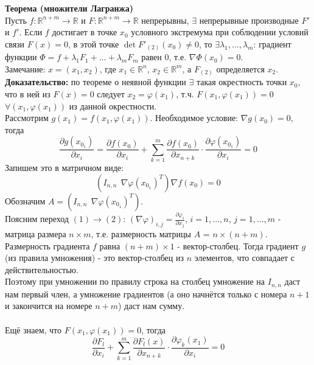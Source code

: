 \documentclass[book, 11pt]{report}
\begin{document}
\par{
\textbf{Теорема (множители Лагранжа)}\\
Пусть $f:\mathbb{R}^{n+m}\to\mathbb{R}$ и $F:\mathbb{R}^{n+m}\to\mathbb{R}$ непрерывны, $\exists$ непрерывные производные $F'$ и $f'$. Если $f$ достигает в точке $x_0$ условного экстремума при соблюдении условий связи $F(x)=0$, в этой точке $\det F'_{(2)}(x_0)\ne0$, то $\exists\lambda_1,\ldots,\lambda_m$: градиент функции $\Phi=f+\lambda_1F_1+\ldots+\lambda_mF_m$ равен 0, т.е. $\nabla\Phi(x_0)=0$.\\
Замечание: $x=(x_{1},x_{2})$, где $x_1\in\mathbb{R}^n$, $x_2\in\mathbb{R}^m$, а $F_{(2)}$ определяется $x_2$.\\
\textbf{Доказательство: }по теореме о неявной функции $\exists$ такая окрестность точки $x_0$, что в ней из $F(x)=0$ следует $x_2=\varphi(x_1)$, т.ч. $F(x_1,\varphi(x_1))=0$ $\forall(x_1,\varphi(x_1))$ из данной окрестности.\\
Рассмотрим $g(x_1)=f(x_1,\varphi(x_1))$. Необходимое условие: $\nabla g(x_0)=0$, тогда
\begin{equation}
    \frac{\partial g(x_{0_1})}{\partial x_i}=\frac{\partial f(x_0)}{\partial x_i}+\sum_{k=1}^m\frac{\partial f(x_0)}{\partial x_{n+k}}\cdot\frac{\partial\varphi(x_{0_1})}{\partial x_i}=0
\end{equation}
Запишем это в матричном виде:
\begin{equation}
    (I_{n,n} \ \ \nabla\varphi(x_{0_1})^T)\nabla f(x_0)=0
\end{equation}
Обозначим $A=(I_{n,n} \ \ \nabla\varphi(x_{0_1})^T)$.\\
Поясним переход $(1)\to(2)$: $\displaystyle(\nabla\varphi)_{i,j}=\frac{\partial\varphi_i}{\partial x_j}$, $i=1,\ldots,n$, $j=1,\ldots,m$ - матрица размера $n\times m$, т.е. размерность матрицы $A$ = $n\times(n+m)$. Размерность градиента $f$ равна $(n+m)\times1$ - вектор-столбец. Тогда градиент $g$ (из правила умножения) - это вектор-столбец из $n$ элементов, что совпадает с действительностью.\\
Поэтому при умножении по правилу строка на столбец умножение на $I_{n,n}$ даст нам первый член, а умножение градиентов (а оно начнётся только с номера $n+1$ и закончится на номере $n+m$) даст нам сумму. \\ \\
Ещё знаем, что $F(x_1,\varphi(x_1))=0$, тогда
\begin{equation}
    \frac{\partial F_l}{\partial x_i}+\sum_{k=1}^m\frac{\partial F_l(x)}{\partial x_{n+k}}\cdot\frac{\partial\varphi_k(x_1)}{\partial x_i}=0

\end{equation}}
\end{document}
